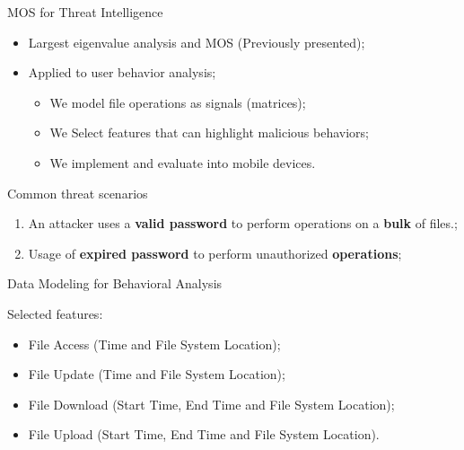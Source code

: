 \documentclass[newPxFont, numfooter, sectionpages]{beamer}
\begin{document}
\begin{frame}[c]{MOS for Threat Intelligence}
	
	\begin{itemize}
		\item Largest eigenvalue analysis and MOS (Previously presented);
		\item Applied to user behavior analysis;
		\begin{itemize}
			\item We model file operations as signals (matrices);
			\item We Select features that can highlight malicious behaviors;
			\item We implement and evaluate into mobile devices.
		\end{itemize}
	\end{itemize}
	
\end{frame}
\begin{frame}[c]{Common threat scenarios}
	
	\begin{enumerate}
		\item An attacker uses a \textbf{valid password} to perform operations on a \textbf{bulk} of files.;
		\item Usage of \textbf{expired password} to perform unauthorized \textbf{operations};
	\end{enumerate}
	
\end{frame}
\begin{frame}[c]{Data Modeling for Behavioral Analysis}
	
	Selected features:
	\begin{itemize}
		\item File Access (Time and File System Location);
		\item File Update (Time and File System Location);
		\item File Download (Start Time, End Time and File System Location);
		\item File Upload (Start Time, End Time and File System Location).
	\end{itemize}
	
\end{frame}
\end{document}

